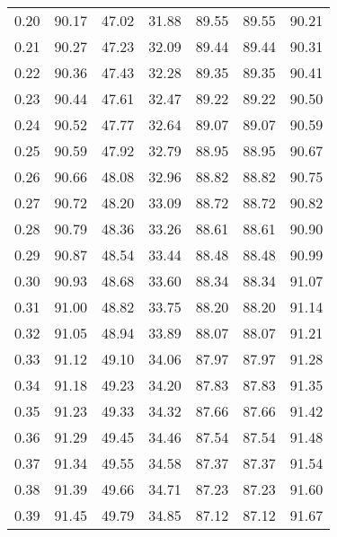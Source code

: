 \begin{tabular}{|c|c|c|c|c|c|c|}
      0.20 &     90.17 &     47.02 &      31.88 &   89.55 &      89.55 &         90.21 \\
      0.21 &     90.27 &     47.23 &      32.09 &   89.44 &      89.44 &         90.31 \\
      0.22 &     90.36 &     47.43 &      32.28 &   89.35 &      89.35 &         90.41 \\
      0.23 &     90.44 &     47.61 &      32.47 &   89.22 &      89.22 &         90.50 \\
      0.24 &     90.52 &     47.77 &      32.64 &   89.07 &      89.07 &         90.59 \\
      0.25 &     90.59 &     47.92 &      32.79 &   88.95 &      88.95 &         90.67 \\
      0.26 &     90.66 &     48.08 &      32.96 &   88.82 &      88.82 &         90.75 \\
      0.27 &     90.72 &     48.20 &      33.09 &   88.72 &      88.72 &         90.82 \\
      0.28 &     90.79 &     48.36 &      33.26 &   88.61 &      88.61 &         90.90 \\
      0.29 &     90.87 &     48.54 &      33.44 &   88.48 &      88.48 &         90.99 \\
      0.30 &     90.93 &     48.68 &      33.60 &   88.34 &      88.34 &         91.07 \\
      0.31 &     91.00 &     48.82 &      33.75 &   88.20 &      88.20 &         91.14 \\
      0.32 &     91.05 &     48.94 &      33.89 &   88.07 &      88.07 &         91.21 \\
      0.33 &     91.12 &     49.10 &      34.06 &   87.97 &      87.97 &         91.28 \\
      0.34 &     91.18 &     49.23 &      34.20 &   87.83 &      87.83 &         91.35 \\
      0.35 &     91.23 &     49.33 &      34.32 &   87.66 &      87.66 &         91.42 \\
      0.36 &     91.29 &     49.45 &      34.46 &   87.54 &      87.54 &         91.48 \\
      0.37 &     91.34 &     49.55 &      34.58 &   87.37 &      87.37 &         91.54 \\
      0.38 &     91.39 &     49.66 &      34.71 &   87.23 &      87.23 &         91.60 \\
      0.39 &     91.45 &     49.79 &      34.85 &   87.12 &      87.12 &         91.67 \\

\end{tabular}
